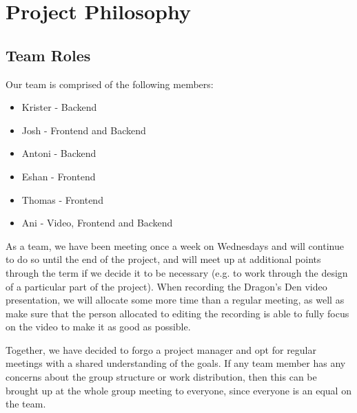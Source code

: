 \documentclass{article}
\begin{document}
\section{Project Philosophy}
\subsection{Team Roles}
Our team is comprised of the following members:

\begin{itemize}
  \item Krister - Backend 
  \item Josh - Frontend and Backend 
  \item Antoni - Backend 
  \item Eshan - Frontend
  \item Thomas - Frontend
  \item Ani - Video, Frontend and Backend
\end{itemize}

As a team, we have been meeting once a week on Wednesdays and will continue to do 
so until the end of the project, and will meet up at additional points through the term if we decide it to be necessary (e.g. to work through the design of a particular part of the project). When recording the Dragon's 
Den video presentation, we will allocate some more time than a regular meeting, as well as make sure that 
the person allocated to editing the recording is able to fully focus on the video to make it as good as possible. 

Together, we have decided to forgo a project manager and opt for regular meetings 
with a shared understanding of the goals. If any team member has any concerns about the group 
structure or work distribution, then this can be brought up at the whole group meeting 
to everyone, since everyone is an equal on the team.
\end{document}
